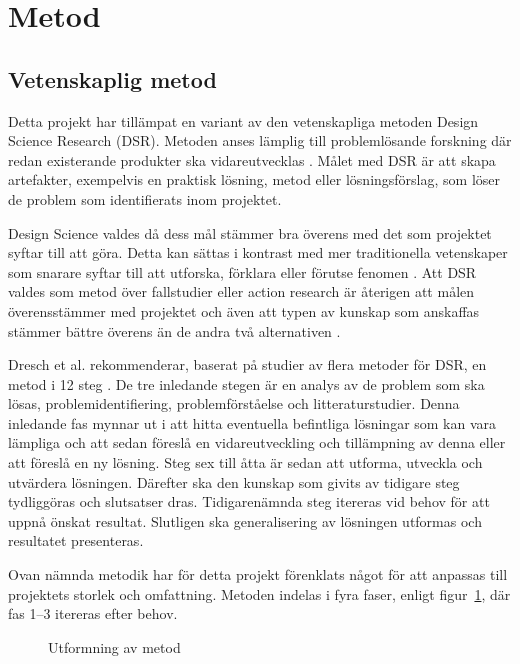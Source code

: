 \section{Metod} %
\label{sec:metod}
    
    \subsection{Vetenskaplig metod} %
    \label{sub:vetenskaplig_metod}
    	Detta projekt har tillämpat en variant av den vetenskapliga metoden Design Science Research (DSR). Metoden anses lämplig till problemlösande forskning där redan existerande produkter ska vidareutvecklas \cite{dsr}. Målet med DSR är att skapa artefakter, exempelvis en praktisk lösning, metod eller lösningsförslag, som löser de problem som identifierats inom projektet. \bigskip

        Design Science valdes då dess mål stämmer bra överens med det som projektet syftar till att göra. Detta kan sättas i kontrast med mer traditionella vetenskaper som snarare syftar till att utforska, förklara eller förutse fenomen \cite[s.~13]{dsr}. Att DSR valdes som metod över fallstudier eller action research är återigen att målen överensstämmer med projektet och även att typen av kunskap som anskaffas stämmer bättre överens än de andra två alternativen \cite[s.~95]{dsr}.\bigskip

    	Dresch et al. rekommenderar, baserat på studier av flera metoder för DSR, en metod i 12 steg \cite[s.~118--126]{dsr}. De tre inledande stegen är en analys av de problem som ska lösas, problemidentifiering, problemförståelse och litteraturstudier. Denna inledande fas mynnar ut i att hitta eventuella befintliga lösningar som kan vara lämpliga och att sedan föreslå en vidareutveckling och tillämpning av denna eller att föreslå en ny lösning. Steg sex till åtta är sedan att utforma, utveckla och utvärdera lösningen. Därefter ska den kunskap som givits av tidigare steg tydliggöras och slutsatser dras. Tidigarenämnda steg itereras vid behov för att uppnå önskat resultat. Slutligen ska generalisering av lösningen utformas och resultatet presenteras. \bigskip

    	Ovan nämnda metodik har för detta projekt förenklats något för att anpassas till projektets storlek och omfattning. Metoden indelas i fyra faser, enligt figur~\ref{fig:method}, där fas 1--3 itereras efter behov.

        \begin{figure}[b]
            \centering
            
            \caption{\label{fig:method} Utformning av metod}
        \end{figure}

